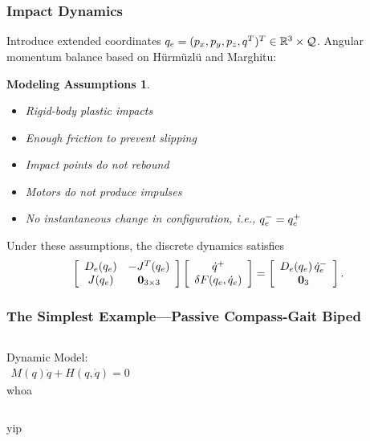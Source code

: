 \documentclass{beamer}
\newtheorem{massump}{Modeling Assumptions}
\begin{document}
\begin{frame}
\begin{columns}[t]
\begin{column}{.45\textwidth}
\begin{figure}
      \end{figure}
    \end{column}
  \end{columns}
\end{frame}

\begin{frame}
  \frametitle{Impact Dynamics}
  Introduce extended coordinates $q_{e} = (p_{x}, p_{y}, p_{z}, q^{T})^{T} \in \mathbb{R}^{3} \times \mathcal{Q}$. Angular momentum balance based on H{\"u}rm{\"u}zl{\"u} and Marghitu:
  \begin{massump}
    \begin{itemize}
    \item Rigid-body plastic impacts
    \item Enough friction to prevent slipping
    \item Impact points do not rebound
    \item Motors do not produce impulses
    \item No instantaneous change in configuration, i.e., $q_{e}^{-} = q_{e}^{+}$
    \end{itemize}
  \end{massump}
  Under these assumptions, the discrete dynamics satisfies
  \begin{align*}
    \left[\begin{array}{c c}
        D_{e}(q_{e}) & -J^{T}(q_{e})\\
        J(q_{e}) & \mathbf{0}_{3 \times 3}
      \end{array}\right]
    \left[\begin{array}{c}
        \dot q^{+}\\
        \delta F(q_{e}, \dot q_{e})
      \end{array}\right]
    = \left[\begin{array}{c c}
        D_{e}(q_{e}) \, \dot q_{e}^{-}\\
        \mathbf{0}_{3}
      \end{array}\right].
  \end{align*}
\end{frame}

\begin{frame}
  \frametitle{The Simplest Example---Passive Compass-Gait Biped}

  \begin{columns}[l]
    \column{1.5in}
    Dynamic Model:
    \begin{align*}
      M(q) \ddot q + H(q, \dot q) = 0
    \end{align*}
    \column{1.5in}
    whoa
  \end{columns}
  yip
\end{frame}
\end{document}
